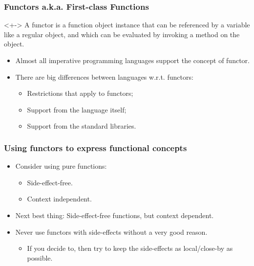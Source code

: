 \begin{frame}
	\frametitle{Functors a.k.a. First-class Functions}
	\begin{block}{}<+->
		A \alert{functor} is a function object instance that can be referenced by a variable like a regular object, and which can be evaluated by invoking a method on the object.
	\end{block}

	\begin{itemize}[<+-| highlight@+>]
		\item Almost all imperative programming languages support the concept of functor.
		\item There are big differences between languages w.r.t. functors:
		\begin{itemize}[<+-| highlight@+>]
			\item Restrictions that apply to functors;
			\item Support from the language itself;
			\item Support from the standard libraries.
		\end{itemize}
	\end{itemize}
\end{frame}


\begin{frame}
	\frametitle{Using functors to express functional concepts}
	\begin{itemize}[<+-| highlight@+>]
		\item Consider using \alert{pure functions}:
		\begin{itemize}[<+-| highlight@+>]
			\item Side-effect-free.
			\item Context independent.
		\end{itemize}
		\item Next best thing: Side-effect-free functions, but context dependent.
		\item Never use functors with side-effects without a very good reason.
		\begin{itemize}[<+-| highlight@+>]
			\item If you decide to, then try to keep the side-effects as local/close-by as possible.
		\end{itemize}
	\end{itemize}
\end{frame}

